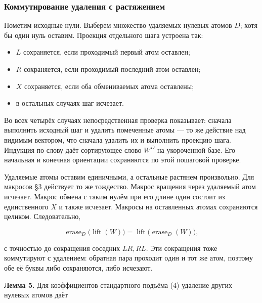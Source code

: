 \documentclass[
  11pt,
  a4paper,
]{article}
\providecommand{\tightlist}{%
  \setlength{\itemsep}{0pt}\setlength{\parskip}{0pt}}
\begin{document}
\hypertarget{ux43aux43eux43cux43cux443ux442ux438ux440ux43eux432ux430ux43dux438ux435-ux443ux434ux430ux43bux435ux43dux438ux44f-ux441-ux440ux430ux441ux442ux44fux436ux435ux43dux438ux435ux43c}{%
\subsubsection{Коммутирование удаления с
растяжением}\label{ux43aux43eux43cux43cux443ux442ux438ux440ux43eux432ux430ux43dux438ux435-ux443ux434ux430ux43bux435ux43dux438ux44f-ux441-ux440ux430ux441ux442ux44fux436ux435ux43dux438ux435ux43c}}

Пометим исходные нули. Выберем множество удаляемых нулевых атомов \(D\);
хотя бы один нуль оставим. Проекция отдельного шага устроена так:

\begin{itemize}
\tightlist
\item
  \(L\) сохраняется, если проходимый первый атом оставлен;
\item
  \(R\) сохраняется, если проходимый последний атом оставлен;
\item
  \(X\) сохраняется, если оба обмениваемых атома оставлены;
\item
  в остальных случаях шаг исчезает.
\end{itemize}

Во всех четырёх случаях непосредственная проверка показывает: сначала
выполнить исходный шаг и удалить помеченные атомы --- то же действие над
видимым вектором, что сначала удалить их и выполнить проекцию шага.
Индукция по слову даёт сортирующее слово \(W^D\) на укороченной базе.
Его начальная и конечная ориентации сохраняются по этой пошаговой
проверке.

Удаляемые атомы оставим единичными, а остальные растянем произвольно.
Для макросов §3 действует то же тождество. Макрос вращения через
удаляемый атом исчезает. Макрос обмена с таким нулём при его длине один
состоит из единственного \(X\) и также исчезает. Макросы на оставленных
атомах сохраняются целиком. Следовательно,

\[\operatorname{erase}_D\bigl(\operatorname{lift}(W)\bigr)
=\operatorname{lift}\bigl(\operatorname{erase}_D(W)\bigr),\tag{9}\]

с точностью до сокращения соседних \(LR,RL\). Эти сокращения тоже
коммутируют с удалением: обратная пара проходит один и тот же атом,
поэтому обе её буквы либо сохраняются, либо исчезают.

\textbf{Лемма 5.} Для коэффициентов стандартного подъёма (4) удаление
других нулевых атомов даёт
\end{document}
